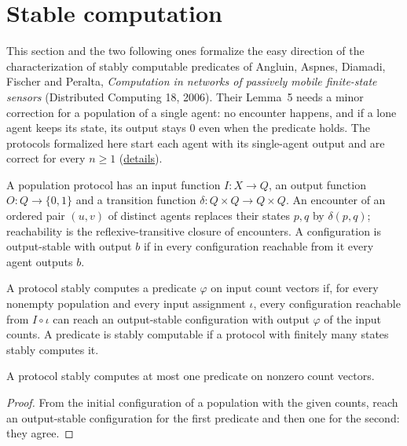 \section{Stable computation}\label{sec:aadfp-stable}
This section and the two following ones formalize the easy direction of the characterization of
stably computable predicates of Angluin, Aspnes, Diamadi, Fischer and Peralta,
\emph{Computation in networks of passively mobile finite-state sensors} (Distributed Computing
18, 2006). Their Lemma~5 needs a minor correction for a population of a single agent: no
encounter happens, and if a lone agent keeps its state, its output stays $0$ even when the
predicate holds. The protocols
formalized here start each agent with its single-agent output and are correct for every $n\ge1$
(\href{https://github.com/formal-dynamics/leanamics/blob/main/crn/FORMALIZATION_DIFFERENCES.md#semilinear-predicates-are-stably-computable-stable-crn-3-easy-direction}{details}).
\begin{definition}\label{def:protocol}
\leanok{}
A population protocol has an input function $I : X \to Q$, an output function $O : Q \to
\{0, 1\}$ and a transition function $\delta : Q \times Q \to Q \times Q$. An encounter of an
ordered pair $(u, v)$ of distinct agents replaces their states $p, q$ by $\delta(p, q)$;
reachability is the reflexive-transitive closure of encounters. A configuration is
output-stable with output $b$ if in every configuration reachable from it every agent outputs $b$.
\end{definition}

\begin{definition}\label{def:stable}
\leanok{}
A protocol stably computes a predicate $\varphi$ on input count vectors if, for every nonempty
population and every input assignment $\iota$, every configuration reachable from $I \circ \iota$
can reach an output-stable configuration with output $\varphi$ of the input counts. A predicate is
stably computable if a protocol with finitely many states stably computes it.
\end{definition}

\begin{lemma}[Uniqueness]\label{lem:stable-unique}
\leanok{}
A protocol stably computes at most one predicate on nonzero count vectors.
\end{lemma}
\begin{proof}\leanok
From the initial configuration of a population with the given counts, reach an output-stable
configuration for the first predicate and then one for the second: they agree.
\end{proof}

